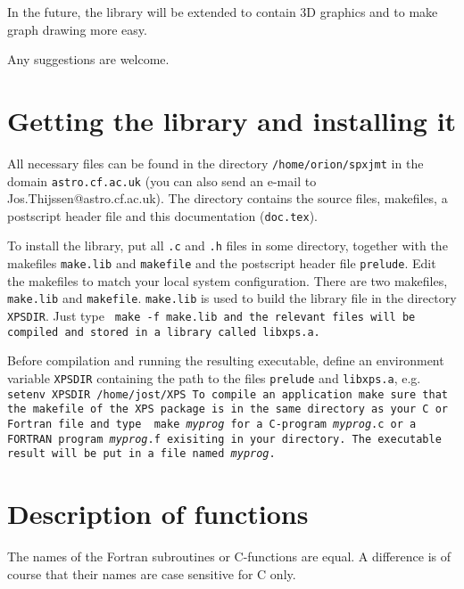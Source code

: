 In the future, the library will be extended to contain 3D graphics and to 
make graph drawing more easy. 

Any suggestions are welcome. 

\section{Getting the library and installing it}

All necessary files can be found in the directory {\tt /home/orion/spxjmt} in the
domain {\tt astro.cf.ac.uk} (you can also send an e-mail to Jos.Thijssen@astro.cf.ac.uk).
The directory contains the source files, makefiles, a postscript
header file and this documentation ({\tt doc.tex}).

To install the library, put all {\tt .c} and {\tt .h} files in some directory,
together with the makefiles {\tt make.lib} and {\tt makefile} and the postscript
header file {\tt prelude}. Edit the makefiles to match your local system 
configuration. 
There are two makefiles, {\tt make.lib} and {\tt makefile}. {\tt make.lib}
is used to build the library file in the directory {\tt XPSDIR}. Just type 
\bq
\tt
make -f make.lib
\eq
and the relevant files will be compiled and stored in a library called 
libxps.a.

Before compilation and running the resulting executable, define an environment 
variable 
{\tt XPSDIR} containing the path to the files {\tt prelude} and {\tt libxps.a},
e.g.
\bq
\tt
setenv XPSDIR /home/jost/XPS
\eq
To compile an application make sure that the {\tt makefile} of the XPS package
is in the same directory as your C or Fortran file and type 
\bq
\tt
make {\it myprog}
\eq 
for a C-program {\it myprog}.c or a FORTRAN program {\it myprog}.f exisiting
in your directory.
The executable result will be put in a file named {\it myprog}. 

\section{Description of functions}
The names of the Fortran subroutines or C-functions are equal. A difference 
is of course that their names are case sensitive for C only. 
\\

